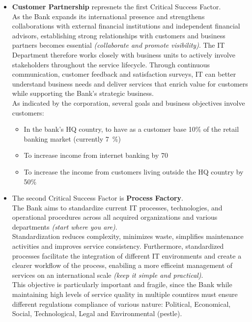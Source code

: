 \begin{itemize}
    \item \textbf{Customer Partnership} represnets the first Critical Success Factor. \\
    As the Bank expands its international presence and strengthens collaborations with external financial institutions and independent financial advisors, establishing strong relationships with customers and business partners becomes essential \textit{(collaborate and promote visibility)}. The IT Department therefore works closely with business units to actively involve stakeholders throughout the service lifecycle. Through continuous communication, customer feedback and satisfaction surveys, IT can better understand business needs and deliver services that enrich value for customers while supporting the Bank's strategic business. \\
    As indicated by the corporation, several goals and business objectives involve customers:
    \begin{itemize}
        \item In the bank's HQ country, to have as a customer base 10\% of the retail banking market (currently 7~\%)
        \item To increase income from internet banking by 70%
        \item To increase the income from customers living outside the HQ country by 50\%
    \end{itemize}

    \item The second Critical Success Factor is \textbf{Process Factory}. \\
    The Bank aims to standardize current IT processes, technologies, and operational procedures across all acquired organizations and various departments \textit{(start where you are)}. \\
    Standardization reduces complexity, minimizes waste, simplifies maintenance activities and improves service consistency. 
    Furthermore, standardized processes facilitate the integration of different IT environments and create a clearer workflow of the process, enabiling a more efficeint management of services on an international scale \textit{(keep it simple and practical)}. \\
    This objective is particularly important and fragile, since the Bank while maintaining high levels of service quality in multiple countires must ensure different regulations compliance of various nature: Political, Economical, Social, Technological, Legal and Environmental (\gls{pestle}). 
    

\end{itemize}
